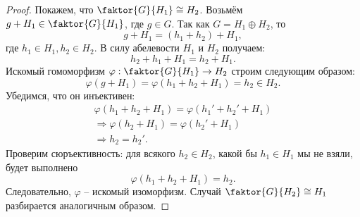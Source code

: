 \documentclass{article}
\begin{document}
\begin{proof}
    Покажем, что $ \faktor{G}{H_1} \cong H_2 $. Возьмём $ g + H_1 \in \faktor{G}{H_1} $, где $g \in G$. Так как $G = H_1 \oplus H_2 $, то $$ g + H_1 = (h_1 + h_2) + H_1, $$ где $h_1 \in H_1, h_2 \in H_2$. В силу абелевости $H_1$ и $H_2$ получаем: $$ h_2 + h_1 + H_1 = h_2 + H_1. $$ Искомый гомоморфизм $\varphi: \faktor{G}{H_1} \to H_2 $ строим следующим образом: $$ \varphi(g + H_1) = \varphi(h_1 + h_2 + H_1) = h_2 \in H_2. $$ Убедимся, что он инъективен:
    \begin{align*}
        \varphi(h_1 + h_2 + H_1) = \varphi(h_1' + h_2' + H_1) \\
        \Rightarrow \varphi(h_2 + H_1) = \varphi(h_2' + H_1) \\ 
        \Rightarrow h_2 = h_2'.
    \end{align*}
    Проверим сюръективность: для всякого $ h_2 \in H_2$, какой бы $h_1 \in H_1 $ мы не взяли, будет выполнено $$ \varphi(h_1 + h_2 + H_1) = h_2. $$ Следовательно, $\varphi$ -- искомый изоморфизм.
    Случай $ \faktor{G}{H_2} \cong H_1 $ разбирается аналогичным образом.
\end{proof}
\end{document}

